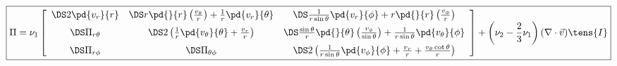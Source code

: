\documentclass{article}
\begin{document}
\[
    \boxed{
    \Pi = \nu_1\left[\begin{array}{ccc}
      \DS  2\pd{v_r}{r}
    & \DS   r\pd{}{r}\left(\frac{v_\theta}{r}\right) + \frac{1}{r}\pd{v_r}{\theta}
    & \DS   \frac{1}{r\sin\theta}\pd{v_r}{\phi} + r\pd{}{r}\left(\frac{v_\phi}{r}\right)
    \\ \noalign{\medskip}
      \DS  \Pi_{r\theta}
    & \DS  2\left(\frac{1}{r}\pd{v_\theta}{\theta} + \frac{v_r}{r}\right)
    & \DS   \frac{\sin\theta}{r}\pd{}{\theta}\left(\frac{v_\phi}{\sin\theta}\right)
          + \frac{1}{r\sin\theta}\pd{v_\theta}{\phi}
    \\ \noalign{\medskip}
      \DS \Pi_{r\phi}
    & \DS \Pi_{\theta\phi}
    & \DS 2\left(  \frac{1}{r\sin\theta}\pd{v_\phi}{\phi} + \frac{v_r}{r}
                 + \frac{v_\theta\cot\theta}{r}\right)
    \end{array}\right]
    + \left(\nu_2 - \frac{2}{3}\nu_1\right)(\nabla\cdot\vec{v}) \tens{I}
    }
  \]
\pagebreak
\end{document}
